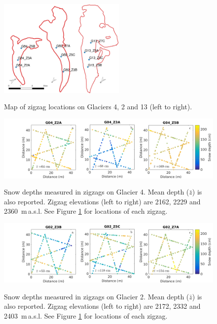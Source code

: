 \documentclass{sfuthesis}
\begin{document}
\begin{figure}[H]
	\centering
	\includegraphics[width = 0.55\textwidth]{map_zigzaglocation_all.jpeg}\\
	\caption{Map of zigzag locations on Glaciers 4, 2 and 13 (left to right).}
	\label{fig:ZZ_locations}
\end{figure}

\begin{landscape}
\begin{figure}
	\centering
	\includegraphics[width = 21 cm]{ZigzagDepth_G04.png}\\
	\caption{Snow depths measured in zigzags on Glacier 4. Mean depth ($\bar{z}$) is also reported. Zigzag elevations (left to right) are 2162, 2229 and 2360 \,m\,a.s.l. See Figure \ref{fig:ZZ_locations} for locations of each zigzag.}
	\label{fig:ZZ_G04}
\end{figure}

\begin{figure}
	\centering
	\includegraphics[width = 21 cm]{ZigzagDepth_G02.png}\\
	\caption{Snow depths measured in  zigzags on Glacier 2. Mean depth ($\bar{z}$) is also reported. Zigzag elevations (left to right) are 2172, 2332 and 2403 \,m\,a.s.l. See Figure \ref{fig:ZZ_locations} for locations of each zigzag.}
	\label{fig:ZZ_G02}
\end{figure}
\end{landscape}
\end{document}

